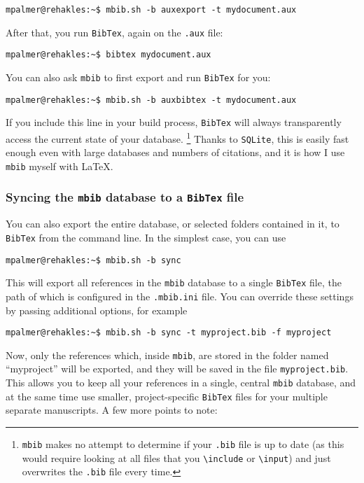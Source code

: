 \documentclass[10pt]{article}
\newcommand*{\mbib}{\texttt{mbib}\xspace}
\newcommand*{\bibtex}{\texttt{BibTex}\xspace}
\newcommand*{\sqlite}{\texttt{SQLite}\xspace}
\newcommand*{\ini}{\texttt{.mbib.ini}\xspace}
\begin{document}
\begin{verbatim}
mpalmer@rehakles:~$ mbib.sh -b auxexport -t mydocument.aux
\end{verbatim}

\noindent After that, you run \bibtex, again on the \texttt{.aux} file:

\begin{verbatim}
mpalmer@rehakles:~$ bibtex mydocument.aux
\end{verbatim}

\noindent You can also ask \mbib to first export and run \bibtex for you:

\begin{verbatim}
mpalmer@rehakles:~$ mbib.sh -b auxbibtex -t mydocument.aux
\end{verbatim}

\noindent If you include this line in your build process, \bibtex will always transparently access the current state of your database.%
%
\footnote{\mbib makes no attempt to determine if your \texttt{.bib} file is up to date (as this would require looking at all files that you \texttt{\textbackslash include} or \texttt{\textbackslash input}) and just overwrites the \texttt{.bib} file every time.}
% 
Thanks to \sqlite, this is easily fast enough even with large databases and numbers of citations, and it is how I use \mbib myself with \LaTeX. 

\subsubsection{Syncing the \mbib database to a \bibtex file}

You can also export the entire database, or selected folders contained in it, to \bibtex from the command line. In the simplest case, you can use 

\begin{verbatim}
mpalmer@rehakles:~$ mbib.sh -b sync
\end{verbatim}

\noindent This will export all references in the \mbib database to a single \bibtex file, the path of which is configured in the \ini file. You can override these settings by passing additional options, for example 

\begin{verbatim}
mpalmer@rehakles:~$ mbib.sh -b sync -t myproject.bib -f myproject
\end{verbatim}

\noindent Now, only the references which, inside \mbib, are stored in the folder named ``myproject'' will be exported, and they will be saved in the file \texttt{myproject.bib}. This allows you to keep all your references in a single, central \mbib database, and at the same time use smaller, project-specific \bibtex files for your multiple separate manuscripts. A few more points to note: 
\end{document}
